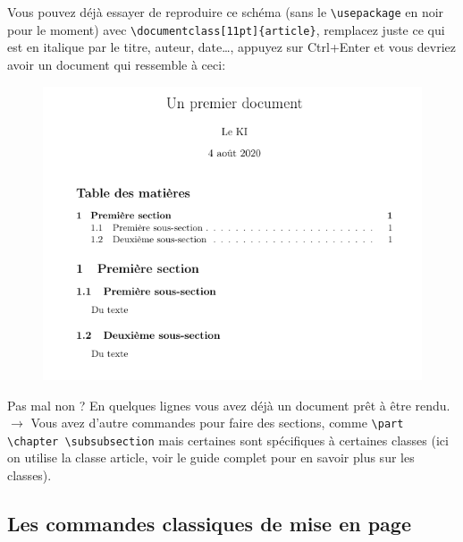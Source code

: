 \documentclass[11pt]{article}				%
\newcommand{\tb}{\textbackslash}
\begin{document}
Vous pouvez déjà essayer de reproduire ce schéma (sans le \texttt{\tb usepackage} en noir pour le moment) avec \texttt{\tb documentclass[11pt]\{article\}}, remplacez juste ce qui est en italique par le titre, auteur, date\dots, appuyez sur Ctrl+Enter et vous devriez avoir un document qui ressemble à ceci:
\begin{figure}[h!]
\begin{center}
	\includegraphics[scale=0.4]{ressources/frover.png}
\end{center}	

\end{figure}


Pas mal non ? En quelques lignes vous avez déjà un document prêt à être rendu.\\

$\rightarrow$ Vous avez d'autre commandes pour faire des sections, comme \texttt{\tb part  \tb chapter  \tb subsubsection} mais certaines sont spécifiques à certaines classes (ici on utilise la classe article, voir le guide complet pour en savoir plus sur les classes).

\subsection*{Les commandes classiques de mise en page}
\end{document}
